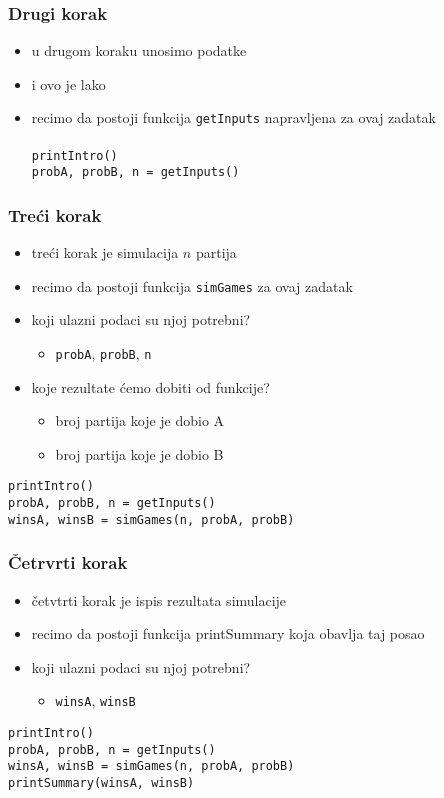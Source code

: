 \documentclass[utf8,compress,aspectratio=169]{beamer}
\begin{document}
\begin{frame}
  \frametitle{Drugi korak}
  \begin{itemize}
    \item u drugom koraku unosimo podatke
    \item i ovo je lako
    \item recimo da postoji funkcija \texttt{getInputs} napravljena za ovaj zadatak \\ \ \\
      \texttt{printIntro()} \\
      \texttt{probA, probB, n = getInputs()}
  \end{itemize}
\end{frame}

\begin{frame}[fragile]
  \frametitle{Treći korak}
  \begin{itemize}
    \item treći korak je simulacija $n$ partija
    \item recimo da postoji funkcija \texttt{simGames} za ovaj zadatak
    \item koji ulazni podaci su njoj potrebni?
    \begin{itemize}
      \item \texttt{probA}, \texttt{probB}, \texttt{n}
    \end{itemize}
    \item koje rezultate ćemo dobiti od funkcije?
    \begin{itemize}
      \item broj partija koje je dobio A
      \item broj partija koje je dobio B
    \end{itemize}
  \end{itemize}
\begin{verbatim}
printIntro()
probA, probB, n = getInputs()
winsA, winsB = simGames(n, probA, probB)
\end{verbatim}
\end{frame}

\begin{frame}[fragile]
  \frametitle{Četrvrti korak}
  \begin{itemize}
    \item četvtrti korak je ispis rezultata simulacije
    \item recimo da postoji funkcija printSummary koja obavlja taj posao
    \item koji ulazni podaci su njoj potrebni?
    \begin{itemize}
      \item \texttt{winsA}, \texttt{winsB}
    \end{itemize}
  \end{itemize}
\begin{verbatim}
printIntro()
probA, probB, n = getInputs()
winsA, winsB = simGames(n, probA, probB)
printSummary(winsA, winsB)
\end{verbatim}
\end{frame}
\end{document}
